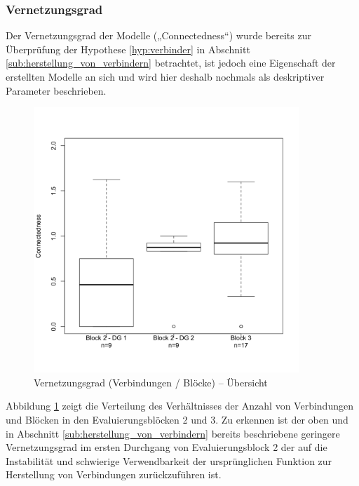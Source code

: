 
\subsubsection{Vernetzungsgrad} %
\label{ssub:vernetzungsgrad}

Der Vernetzungsgrad der Modelle („Connectedness“) wurde bereits zur Überprüfung der Hypothese \ref{hyp:verbinder} in Abschnitt \ref{sub:herstellung_von_verbindern} betrachtet, ist jedoch eine Eigenschaft der erstellten Modelle an sich und wird hier deshalb nochmals als deskriptiver Parameter beschrieben.

\begin{figure}[htbp]
	\centering
		\includegraphics[width=10cm]{img/Evaluierung/connectednessOverview.png}
	\caption{Vernetzungsgrad (Verbindungen / Blöcke) -- Übersicht}
	\label{fig:img_Evaluierung_connectednessOverview}
\end{figure}

Abbildung \ref{fig:img_Evaluierung_connectednessOverview} zeigt die Verteilung des Verhältnisses der Anzahl von Verbindungen und Blöcken in den Evaluierungsblöcken 2 und 3. Zu erkennen ist der oben und in Abschnitt \ref{sub:herstellung_von_verbindern} bereits beschriebene geringere Vernetzungsgrad im ersten Durchgang von Evaluierungsblock 2 der auf die Instabilität und schwierige Verwendbarkeit der ursprünglichen Funktion zur Herstellung von Verbindungen zurückzuführen ist.

